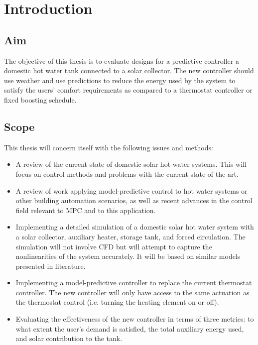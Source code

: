 \chapter{Introduction}

\section{Aim}

The objective of this thesis is to evaluate designs for a predictive controller a domestic hot water tank connected to a solar collector.
The new controller should use weather and use predictions to reduce the energy used by the system to satisfy the users' comfort requirements as compared to a thermostat controller or fixed boosting schedule.

\section{Scope}

This thesis will concern itself with the following issues and methods:

\begin{itemize}
   \item A review of the current state of domestic solar hot water systems.
         This will focus on control methods and problems with the current state of the art.
   \item A review of work applying model-predictive control to hot water systems or other building automation scenarios, as well as recent advances in the control field relevant to MPC and to this application.
   \item Implementing a detailed simulation of a domestic solar hot water system with a solar collector, auxiliary heater, storage tank, and forced circulation.
         The simulation will not involve CFD but will attempt to capture the nonlinearities of the system accurately.
         It will be based on similar models presented in literature.
   \item Implementing a model-predictive controller to replace the current thermostat controller.
         The new controller will only have access to the same actuation as the thermostat control (i.e. turning the heating element on or off).
   \item Evaluating the effectiveness of the new controller in terms of three metrics: to what extent the user's demand is satisfied, the total auxiliary energy used, and solar contribution to the tank.
\end{itemize}

